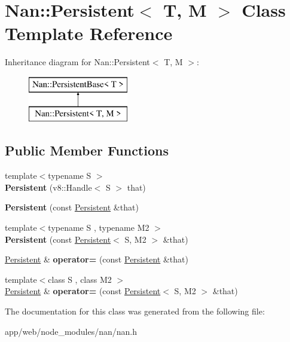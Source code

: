 \hypertarget{class_nan_1_1_persistent}{}\section{Nan\+:\+:Persistent$<$ T, M $>$ Class Template Reference}
\label{class_nan_1_1_persistent}
Inheritance diagram for Nan\+:\+:Persistent$<$ T, M $>$\+:\begin{figure}[H]
\begin{center}
\leavevmode
\includegraphics[height=2.000000cm]{class_nan_1_1_persistent}
\end{center}
\end{figure}
\subsection*{Public Member Functions}
\begin{DoxyCompactItemize}
\item 
\mbox{\label{class_nan_1_1_persistent_a49ab7dba86d8a154d4229b2e3f3643a6}} 
{\footnotesize template$<$typename S $>$ }\\{\bfseries Persistent} (v8\+::\+Handle$<$ S $>$ that)
\item 
\mbox{\label{class_nan_1_1_persistent_adc946ac87eec59b628dc497ad3ba55cb}} 
{\bfseries Persistent} (const \hyperlink{class_nan_1_1_persistent}{Persistent} \&that)
\item 
\mbox{\label{class_nan_1_1_persistent_a4bc94d6e3e9790833fe76788a3015137}} 
{\footnotesize template$<$typename S , typename M2 $>$ }\\{\bfseries Persistent} (const \hyperlink{class_nan_1_1_persistent}{Persistent}$<$ S, M2 $>$ \&that)
\item 
\mbox{\label{class_nan_1_1_persistent_a3f0372306129335101986365f4469b53}} 
\hyperlink{class_nan_1_1_persistent}{Persistent} \& {\bfseries operator=} (const \hyperlink{class_nan_1_1_persistent}{Persistent} \&that)
\item 
\mbox{\label{class_nan_1_1_persistent_a6ac30abee37ff0b2eef742ca35a627fa}} 
{\footnotesize template$<$class S , class M2 $>$ }\\\hyperlink{class_nan_1_1_persistent}{Persistent} \& {\bfseries operator=} (const \hyperlink{class_nan_1_1_persistent}{Persistent}$<$ S, M2 $>$ \&that)
\end{DoxyCompactItemize}


The documentation for this class was generated from the following file\+:\begin{DoxyCompactItemize}
\item 
app/web/node\+\_\+modules/nan/nan.\+h\end{DoxyCompactItemize}
